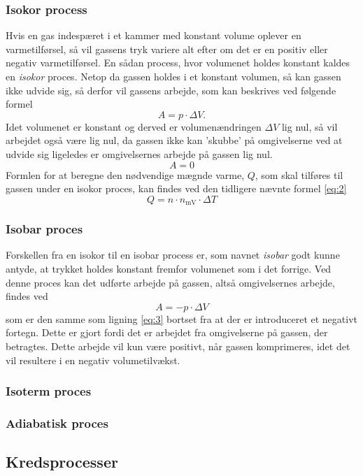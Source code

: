 \documentclass[12pt,a4paper]{article}
\begin{document}
			\subsubsection{Isokor process} 
			Hvis en gas indespæret i et kammer med konstant volume oplever en varmetilførsel, så vil 
			gassens tryk variere alt efter om det er en positiv eller negativ varmetilførsel. En sådan
			process, hvor volumenet holdes konstant kaldes en \textit{isokor} proces. Netop da gassen
			holdes i et konstant volumen, så kan gassen ikke udvide sig, så derfor vil gassens arbejde,
			som kan beskrives ved følgende formel
			\begin{equation}
				A = p \cdot \Delta V.
				\label{eq:3}
			\end{equation}
			Idet volumenet er konstant og derved er volumenændringen \(\Delta V\) lig nul, så vil arbejdet
			også være lig nul, da gassen ikke kan 'skubbe' på omgivelserne ved at udvide sig ligeledes er omgivelsernes arbejde på gassen lig nul.
			\begin{equation}
				A = 0
			\end{equation}
			Formlen for at beregne den nødvendige mægnde varme, \(Q\), som skal tilføres til gassen under en isokor proces, kan findes ved den tidligere nævnte formel \eqref{eq:2}
			\begin{equation}
				Q = n \cdot n_{\text{mV}} \cdot \Delta T
			\end{equation}
			
			\subsubsection{Isobar proces}
			Forskellen fra en isokor til en isobar process er, som
			navnet \textit{isobar} godt kunne antyde, at trykket 
			holdes konstant fremfor volumenet som i det forrige. Ved
			denne proces kan det udførte arbejde på gassen, altså 
			omgivelsernes arbejde, findes ved
			\begin{equation}
				A = -p \cdot \Delta V
			\end{equation}
			som er den samme som ligning \eqref{eq:3} bortset fra at
			der er introduceret et negativt fortegn. Dette er gjort fordi det er arbejdet fra omgivelserne på gassen, der betragtes. Dette arbejde vil kun være positivt, når gassen komprimeres, idet det vil resultere i en negativ volumetilvækst.  
			\subsubsection{Isoterm proces}
			
			\subsubsection{Adiabatisk proces}
			
			\subsection{Kredsprocesser}
\end{document}
